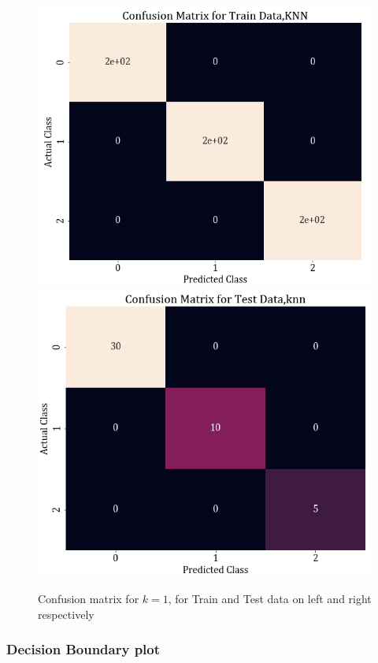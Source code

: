 \documentclass[11pt,a4paper]{article}
\begin{document}
\begin{figure}[H]
    \includegraphics[scale=0.4]{images/1b_conf_mat_knn_train.png}
    \includegraphics[scale=0.4]{images/1b_conf_mat_knn_test.png}
    \caption{Confusion matrix for $k=1$, for Train and Test data on left and right respectively }
    \label{fig:1b_cm_KNN}
\end{figure}

\subsubsection{Decision Boundary plot}
\end{document}
